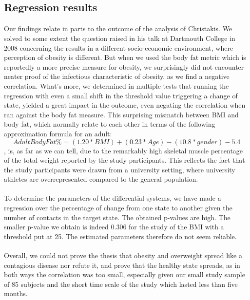 \documentclass[11pt]{article}
\begin{document}
\subsection{Regression results}
\paragraph{}
Our findings relate in parts to the outcome of the analysis of Christakis. We solved to some extent the question raised in his talk at Dartmouth College in 2008 concerning the results in a different socio-economic environment, where perception of obesity is different. But when we used the body fat metric which is reportedly a more precise measure for obesity, we surprisingly did not encounter neater proof of the infectious characteristic of obesity, as we find a negative correlation. What's more, we determined in multiple tests that running the regression with even a small shift in the threshold value triggering a change of state, yielded a great impact in the outcome, even negating the correlation when ran against the body fat measure. This surprising mismatch between BMI and body fat, which normally relate to each other in terms of the following approximation formula for an adult: 
\[Adult Body Fat \% = (1.20 * BMI) + (0.23 * Age) - (10.8 * gender) - 5.4\]
, is, as far as we can tell, due to the remarkably high skeletal muscle percentage of the total weight reported by the study participants. This reflects the fact that the study participants were drawn from a university setting, where university athletes are overrepresented compared to the general population. 

\paragraph{}
To determine the parameters of the differential systems, we have made a regression over the percentage of change from one state to another given the number of contacts in the target state. The obtained p-values are high. The smaller p-value we obtain is indeed 0.306 for the study of the BMI with a threshold put at 25. The estimated parameters therefore do not seem reliable. 

\paragraph{}

Overall, we could not prove the thesis that obesity and overweight spread like a contagious disease nor refute it, and prove that the healthy state spreads, as in both ways the correlation was too small, especially given our small study sample of 85 subjects and the short time scale of the study which lasted less than five months.
\end{document}
